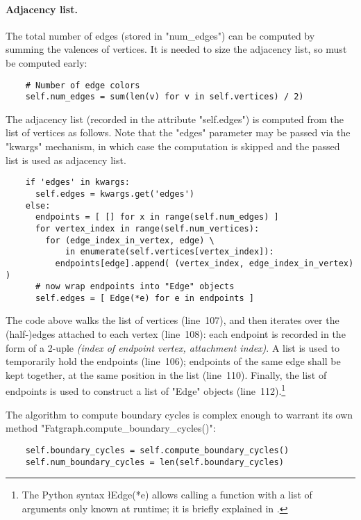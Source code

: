 \paragraph{Adjacency list.}
The total number of edges (stored in "num_edges") can be computed by
summing the valences of vertices.  It is needed to size the adjacency
list, so must be computed early:
\begin{lstlisting}
    # Number of edge colors
    self.num_edges = sum(len(v) for v in self.vertices) / 2)

\end{lstlisting}
The adjacency list (recorded in the attribute "self.edges") is computed
from the list of vertices as follows.  Note that the "edges" parameter
may be passed via the "kwargs" mechanism, in which case the
computation is skipped and the passed list is used as adjacency list.
\begin{lstlisting}
    if 'edges' in kwargs:
      self.edges = kwargs.get('edges')
    else:
      endpoints = [ [] for x in range(self.num_edges) ]
      for vertex_index in range(self.num_vertices):
        for (edge_index_in_vertex, edge) \
            in enumerate(self.vertices[vertex_index]):
          endpoints[edge].append( (vertex_index, edge_index_in_vertex) )
      # now wrap endpoints into "Edge" objects
      self.edges = [ Edge(*e) for e in endpoints ]

\end{lstlisting}
The code above walks the list of vertices (line~107), and then
iterates over the (half-)edges attached to each vertex (line~108):
each endpoint is recorded in the form of a 2-uple \emph{(index of
  endpoint vertex, attachment index)}. A list is used to temporarily
hold the endpoints (line~106); endpoints of the same edge shall be
kept together, at the same position in the list (line~110). Finally,
the list of endpoints is used to construct a list of "Edge" objects
(line~112).\footnote{The Python syntax \l{Edge(*e)} allows calling a
  function with a list of arguments only known at runtime; it is
  briefly explained in \csref{sec:fn-special-syntax}.}

The algorithm to compute boundary cycles is complex enough to warrant
its own method "Fatgraph.compute_boundary_cycles()":
\begin{lstlisting}
    self.boundary_cycles = self.compute_boundary_cycles()
    self.num_boundary_cycles = len(self.boundary_cycles)

\end{lstlisting}

